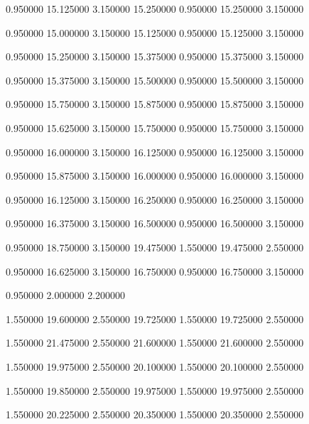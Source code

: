  {0.950000} {15.125000} {3.150000} {15.250000} {0.950000} {15.250000} {3.150000}

 {0.950000} {15.000000} {3.150000} {15.125000} {0.950000} {15.125000} {3.150000}

 {0.950000} {15.250000} {3.150000} {15.375000} {0.950000} {15.375000} {3.150000}

 {0.950000} {15.375000} {3.150000} {15.500000} {0.950000} {15.500000} {3.150000}

 {0.950000} {15.750000} {3.150000} {15.875000} {0.950000} {15.875000} {3.150000}

 {0.950000} {15.625000} {3.150000} {15.750000} {0.950000} {15.750000} {3.150000}

 {0.950000} {16.000000} {3.150000} {16.125000} {0.950000} {16.125000} {3.150000}

 {0.950000} {15.875000} {3.150000} {16.000000} {0.950000} {16.000000} {3.150000}

 {0.950000} {16.125000} {3.150000} {16.250000} {0.950000} {16.250000} {3.150000}

 {0.950000} {16.375000} {3.150000} {16.500000} {0.950000} {16.500000} {3.150000}

 {0.950000} {18.750000} {3.150000} {19.475000} {1.550000} {19.475000} {2.550000}

 {0.950000} {16.625000} {3.150000} {16.750000} {0.950000} {16.750000} {3.150000}

 {0.950000} {2.000000} {2.200000}

 {1.550000} {19.600000} {2.550000} {19.725000} {1.550000} {19.725000} {2.550000}

 {1.550000} {21.475000} {2.550000} {21.600000} {1.550000} {21.600000} {2.550000}

 {1.550000} {19.975000} {2.550000} {20.100000} {1.550000} {20.100000} {2.550000}

 {1.550000} {19.850000} {2.550000} {19.975000} {1.550000} {19.975000} {2.550000}

 {1.550000} {20.225000} {2.550000} {20.350000} {1.550000} {20.350000} {2.550000}

